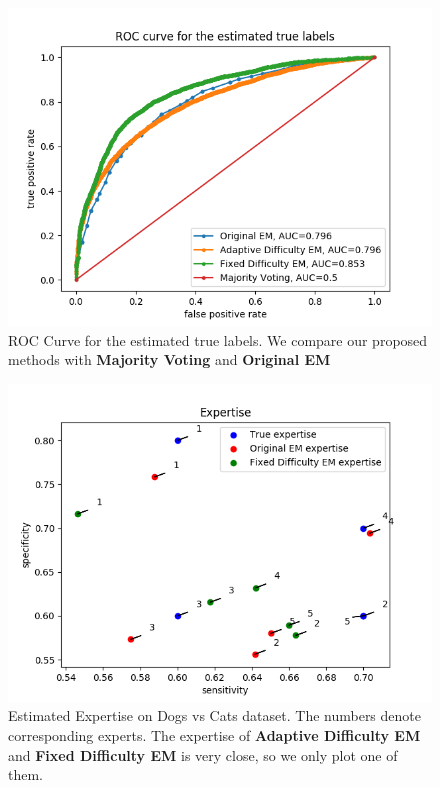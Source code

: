 \begin{figure}[htb]
    \centering
    \includegraphics[width=5.5in]{image/roc_plot_dog.png}
    \caption{ROC Curve for the estimated true labels. We compare our proposed methods with \textbf{Majority Voting} and \textbf{Original EM}} 
    \label{fig:dr}
\end{figure}

\begin{figure}[htb]
    \centering
    \includegraphics[width=5.5in]{image/expertise_dog.png}
    \caption{Estimated Expertise on Dogs vs Cats dataset. The numbers denote corresponding experts. The expertise of \textbf{Adaptive Difficulty EM} and \textbf{Fixed Difficulty EM} is very close, so we only plot one of them. } 
    \label{fig:de}
\end{figure}

